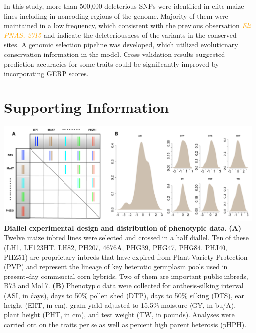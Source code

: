 \documentclass[9pt,twocolumn,twoside]{gsajnl}
\newcommand{\yang}[1]{\textcolor{orange}{\emph{\scriptsize  #1}} }
\newcommand{\beginsupplement}{%
        \setcounter{table}{0}
        \renewcommand{\thetable}{S\arabic{table}}%
        \setcounter{figure}{0}
        \renewcommand{\thefigure}{S\arabic{figure}}%
     }
\begin{document}
In this study, more than 500,000 deleterious SNPs were identified in elite maize lines including in noncoding regions of the genome. Majority of them were maintained in a low frequency, which consistent with the previous observation \yang{Eli PNAS, 2015} and indicate the deleteriousness of the variants in the conserved sites. A genomic selection pipeline was developed, which utilized evolutionary conservation information in the model.
Cross-validation results suggested prediction accuracies for some traits could be significantly improved by incorporating GERP scores. 



\clearpage



\pagebreak
\beginsupplement
\section*{Supporting Information}


\begin{center}\vspace{1cm}
\includegraphics[width=0.8\linewidth]{SFig_pvp.pdf}
{\color{black} \textbf{Diallel experimental design and distribution of phenotypic data.}
\textbf{(A)} Twelve maize inbred lines were selected and crossed in a half diallel. Ten of these (LH1, LH123HT, LH82, PH207, 4676A, PHG39, PHG47, PHG84, PHJ40, PHZ51) are proprietary inbreds that have expired from Plant Variety Protection (PVP) and represent the lineage of key heterotic germplasm pools used in present-day commercial corn hybrids. Two of them are important public inbreds, B73 and Mo17. \textbf{(B)} Phenotypic data were collected for anthesis-silking interval (ASI, in days), days to 50\% pollen shed (DTP), days to 50\% silking (DTS), ear height (EHT, in cm), grain yield adjusted to 15.5\% moisture (GY, in bu/A), plant height (PHT, in cm), and test weight (TW, in pounds). Analyses were carried out on the traits per se as well as percent high parent heterosis (pHPH).
}
\label{fig:pvp-pheno}
\end{center}\vspace{1cm}
\end{document}
